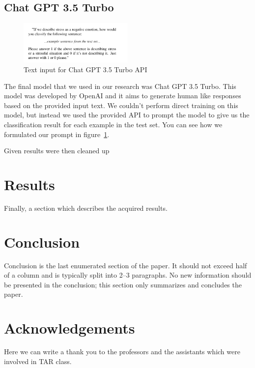 \documentclass[10pt, a4paper]{article}
\begin{document}
\subsection{Chat GPT 3.5 Turbo}

\begin{figure}
    \centering
    \includegraphics[width=0.5\textwidth]{images/chat-gpt-prompt}
    \caption{Text input for Chat GPT 3.5 Turbo API}
    \label{fig:chat-gpt-prompt}
\end{figure}

The final model that we used in our research was Chat GPT 3.5 Turbo.
This model was developed by OpenAI and it aims to generate human like responses based on the provided input text.
We couldn't perform direct training on this model, but instead we used the provided API to prompt the model to give us the classification result for each example in the test set.
You can see how we formulated our prompt in figure~\ref{fig:chat-gpt-prompt}.

Given results were then cleaned up

\section{Results}

Finally, a section which describes the acquired results.

\section{Conclusion}

Conclusion is the last enumerated section of the paper.
It should not exceed half of a column and is typically split into 2--3 paragraphs.
No new information should be presented in the conclusion; this section only summarizes and concludes the paper.

\section*{Acknowledgements}

Here we can write a thank you to the professors and the assistants which were involved in TAR class.



\end{document}
